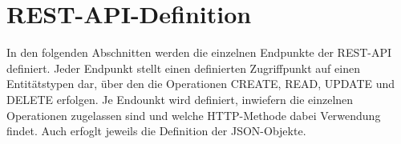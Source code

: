 \chapter{REST-API-Definition}
\label{sec:RESTAPIDefinition}


In den folgenden Abschnitten werden die einzelnen Endpunkte der REST-API definiert.
Jeder Endpunkt stellt einen definierten Zugriffpunkt auf einen Entitätstypen dar, über den die Operationen CREATE, READ, UPDATE und DELETE erfolgen.
Je Endounkt wird definiert, inwiefern die einzelnen Operationen zugelassen sind und welche HTTP-Methode dabei Verwendung findet.
Auch erfoglt jeweils die Definition der JSON-Objekte.






